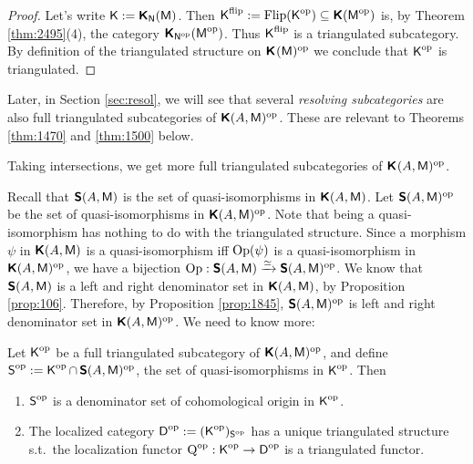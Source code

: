 \begin{proof}
Let's write 
$\operatorname{\mathsf{K}} := \boldsymbol{\mathsf{K}}_{\operatorname{\mathsf{N}}}(\operatorname{\mathsf{M}})$. Then 
$\operatorname{\mathsf{K}}^{\mathrm{flip}} := \operatorname{Flip}(\operatorname{\mathsf{K}}^{\mathrm{op}}) \subseteq 
\boldsymbol{\mathsf{K}}(\operatorname{\mathsf{M}}^{\mathrm{op}})$
is, by Theorem \ref{thm:2495}(4), the category  
$\boldsymbol{\mathsf{K}}_{\operatorname{\mathsf{N}}^{\mathrm{op}}}(\operatorname{\mathsf{M}}^{\mathrm{op}})$. 
Thus $\operatorname{\mathsf{K}}^{\mathrm{flip}}$ is a triangulated subcategory. 
By definition of the triangulated structure on 
$\boldsymbol{\mathsf{K}}^{}(\operatorname{\mathsf{M}})^{\mathrm{op}}$
we conclude that $\operatorname{\mathsf{K}}^{\mathrm{op}}$ is triangulated.
\end{proof}

Later, in Section \ref{sec:resol},  we will see that several {\em resolving 
subcategories} are also full triangulated subcategories of 
$\boldsymbol{\mathsf{K}}(A, \operatorname{\mathsf{M}})^{\mathrm{op}}$.
These are relevant to Theorems \ref{thm:1470} and \ref{thm:1500} below. 

Taking intersections, we get more full triangulated subcategories of  
$\boldsymbol{\mathsf{K}}^{}(A, \operatorname{\mathsf{M}})^{\mathrm{op}}$.

Recall that 
$\boldsymbol{\mathsf{S}}(A, \operatorname{\mathsf{M}})$ is the set of quasi-isomorphisms in 
$\boldsymbol{\mathsf{K}}(A, \operatorname{\mathsf{M}})$. Let $\boldsymbol{\mathsf{S}}(A, \operatorname{\mathsf{M}})^{\mathrm{op}}$ be the 
set of quasi-isomorphisms in $\boldsymbol{\mathsf{K}}(A, \operatorname{\mathsf{M}})^{\mathrm{op}}$.
Note that being a quasi-isomorphism has nothing to do with the 
triangulated structure. Since a morphism $\psi$ in 
$\boldsymbol{\mathsf{K}}(A, \operatorname{\mathsf{M}})$ is a quasi-isomorphism iff 
$\operatorname{Op}(\psi)$ is a quasi-isomorphism in 
$\boldsymbol{\mathsf{K}}(A, \operatorname{\mathsf{M}})^{\mathrm{op}}$, we have a bijection
$\operatorname{Op} : \boldsymbol{\mathsf{S}}(A, \operatorname{\mathsf{M}}) \xrightarrow{\simeq} \boldsymbol{\mathsf{S}}(A, \operatorname{\mathsf{M}})^{\mathrm{op}}$.
We know that $\boldsymbol{\mathsf{S}}(A, \operatorname{\mathsf{M}})$ is a left and right 
denominator set in 
$\boldsymbol{\mathsf{K}}(A, \operatorname{\mathsf{M}})$, by Proposition \ref{prop:106}. 
Therefore, by Proposition \ref{prop:1845},
$\boldsymbol{\mathsf{S}}(A, \operatorname{\mathsf{M}})^{\mathrm{op}}$ is left and right denominator set in 
$\boldsymbol{\mathsf{K}}(A, \operatorname{\mathsf{M}})^{\mathrm{op}}$.
We need to know more: 

\begin{prop} \label{prop:2356}
Let $\operatorname{\mathsf{K}}^{\mathrm{op}}$ be a full triangulated subcategory of 
$\boldsymbol{\mathsf{K}}(A, \operatorname{\mathsf{M}})^{\mathrm{op}}$, and define
$\operatorname{\mathsf{S}}^{\mathrm{op}} := \operatorname{\mathsf{K}}^{\mathrm{op}} \cap \, 
\boldsymbol{\mathsf{S}}(A, \operatorname{\mathsf{M}})^{\mathrm{op}}$,
the set of quasi-isomorphisms in $\operatorname{\mathsf{K}}^{\mathrm{op}}$. 
Then\tup{:}
\begin{enumerate}
\item $\operatorname{\mathsf{S}}^{\mathrm{op}}$ is a denominator set of cohomological origin in 
$\operatorname{\mathsf{K}}^{\mathrm{op}}$.

\item The localized category 
$\operatorname{\mathsf{D}}^{\mathrm{op}} := (\operatorname{\mathsf{K}}^{\mathrm{op}})_{\operatorname{\mathsf{S}}^{\mathrm{op}}}$
has a unique triangulated structure s.t.\ the localization functor 
$\operatorname{Q}^{\mathrm{op}} : \operatorname{\mathsf{K}}^{\mathrm{op}} \to \operatorname{\mathsf{D}}^{\mathrm{op}}$
is a triangulated functor. 
\end{enumerate}
\end{prop}


